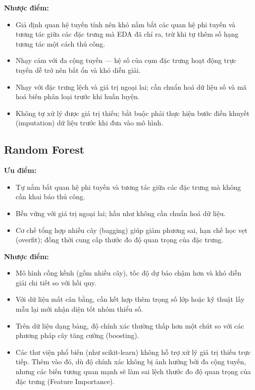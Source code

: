 \documentclass[a4paper]{article}
\newcommand{\code}[1]{{\ttfamily\def\_{\textunderscore\discretionary{}{}{}}#1}}
\def\code#1{#1}%
\def\_{ }%
\begin{document}
\textbf{Nhược điểm:}
\begin{itemize}[leftmargin=*]
  \item Giả định quan hệ tuyến tính nên khó nắm bắt các quan hệ phi tuyến và
        tương tác giữa các đặc trưng mà EDA đã chỉ ra, trừ khi tự thêm số hạng
        tương tác một cách thủ công.
  \item Nhạy cảm với đa cộng tuyến --- hệ số của cụm đặc trưng hoạt động trực
        tuyến dễ trở nên bất ổn và khó diễn giải.
  \item Nhạy với đặc trưng lệch và giá trị ngoại lai; cần chuẩn hoá dữ liệu số
        và mã hoá biến phân loại trước khi huấn luyện.
  \item Không tự xử lý được giá trị thiếu; bắt buộc phải thực hiện bước điền
        khuyết (imputation) dữ liệu trước khi đưa vào mô hình.
\end{itemize}

\subsection{Random Forest}

\textbf{Ưu điểm:}
\begin{itemize}[leftmargin=*]
  \item Tự nắm bắt quan hệ phi tuyến và tương tác giữa các đặc trưng mà không
        cần khai báo thủ công.
  \item Bền vững với giá trị ngoại lai; hầu như không cần chuẩn hoá dữ liệu.
  \item Cơ chế tổng hợp nhiều cây (bagging) giúp giảm phương sai, hạn chế học
        vẹt (overfit); đồng thời cung cấp thước đo độ quan trọng của đặc trưng.
\end{itemize}

\textbf{Nhược điểm:}
\begin{itemize}[leftmargin=*]
  \item Mô hình cồng kềnh (gồm nhiều cây), tốc độ dự báo chậm hơn và khó diễn
        giải chi tiết so với hồi quy.
  \item Với dữ liệu mất cân bằng, cần kết hợp thêm trọng số lớp hoặc kỹ thuật
        lấy mẫu lại mới nhận diện tốt nhóm thiểu số.
  \item Trên dữ liệu dạng bảng, độ chính xác thường thấp hơn một chút so với
        các phương pháp cây tăng cường (boosting).
  \item Các thư viện phổ biến (như \code{scikit-learn}) không hỗ trợ xử lý giá trị
        thiếu trực tiếp. Thêm vào đó, dù độ chính xác không bị ảnh hưởng bởi
        đa cộng tuyến, nhưng các biến tương quan mạnh sẽ làm sai lệch thước
        đo độ quan trọng của đặc trưng (Feature Importance).
\end{itemize}
\end{document}
